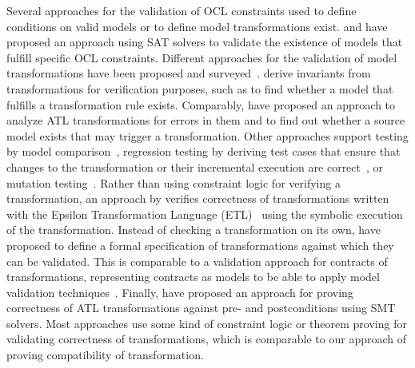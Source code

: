 Several approaches for the validation of \gls{OCL} constraints used to define conditions on valid models or to define model transformations exist.
\textcite{kuhlmann2011a} and \textcite{gonzalez2012a} have proposed an approach using SAT solvers to validate the existence of models that fulfill specific \gls{OCL} constraints.
Different approaches for the validation of model transformations have been proposed and surveyed~\cite{calegari2013verificationTransformations-ENTCS,rahim2015SurveyTransformationVerification-SoSym}.
\textcite{cabot2010VerificationInvariants-JSS} derive invariants from transformations for verification purposes, such as to find whether a model that fulfills a transformation rule exists.
Comparably, \textcite{cuadrado2017tse} have proposed an approach to analyze \gls{ATL} transformations for errors in them and to find out whether a source model exists that may trigger a transformation.
Other approaches support testing by model comparison~\cite{kolovos2006transformationTesting-WGIMM}, regression testing by deriving test cases that ensure that changes to the transformation or their incremental execution are correct~\cite{troy2018inferenceTransformations-JSS}, or mutation testing~\cite{troya2015imutationTestingTransformations-ICSTW}.
Rather than using constraint logic for verifying a transformation, an approach by \textcite{azizi2017ContractVerification-ICCKE} verifies correctness of transformations written with the Epsilon Transformation Language (ETL)~\cite{kolovos2014epsilon-Book} using the symbolic execution of the transformation.
Instead of checking a transformation on its own, \textcite{vallecillo2012FormalTesting-FMMDE} have proposed to define a formal specification of transformations against which they can be validated.
This is comparable to a validation approach for contracts of transformations, representing contracts as models to be able to apply model validation techniques~\cite{braga2014consistencyTransformations-SCP}.
Finally, \textcite{buettner2012models} have proposed an approach for proving correctness of \gls{ATL} transformations against pre- and postconditions using \gls{SMT} solvers.
Most approaches use some kind of constraint logic or theorem proving for validating correctness of transformations, which is comparable to our approach of proving compatibility of transformation.

